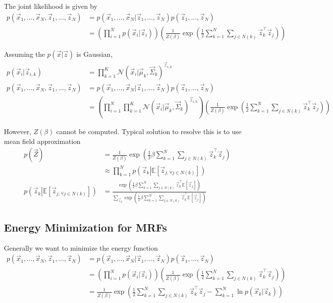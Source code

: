 \documentclass[12pt,twoside]{article}
\begin{document}
The joint likelihood is given by
\begin{align*}
	p(\vec{x}_1, \ldots, \vec{x}_N,\vec{z}_1, \ldots, \vec{z}_N) 
	& = p(\vec{x}_1, \ldots, \vec{x}_N \vert \vec{z}_1, \ldots, \vec{z}_N) p(\vec{z}_1, \ldots, \vec{z}_N)\\
	& = \left(\prod_{i=1}^N p(\vec{x}_i \vert \vec{z}_i)\right)\left(\frac{1}{Z(\beta)} \exp\left(\frac{1}{2} \sum_{k=1}^N \sum_{j\in N(k)} \vec{z}_k^\top\vec{z}_j\right)\right)	
\end{align*}

Assuming the $p(\vec{x}\vert \vec{z})$ is Gaussian,
\begin{align*}
	p(\vec{x}_i\vert \vec{z}_{i,k}) 
	&= \prod_{k=1}^K \mathcal{N}(\vec{x}_i \vert \vec{\mu}_k, \vec{\Sigma}_k)^{\vec{z}_{i,k}}\\
	p(\vec{x}_1, \ldots, \vec{x}_N,\vec{z}_1, \ldots, \vec{z}_N) 
	& = p(\vec{x}_1, \ldots, \vec{x}_N \vert \vec{z}_1, \ldots, \vec{z}_N) p(\vec{z}_1, \ldots, \vec{z}_N)\\
	& = \left(\prod_{i=1}^N \prod_{k=1}^K \mathcal{N} (\vec{x}_i \vert \vec{\mu}_k, \vec{\Sigma}_k)^{\vec{z}_{i,k}}\right) \left(\frac{1}{Z(\beta)} \exp\left(\frac{1}{2} \sum_{k=1}^N \sum_{j\in N(k)} \vec{z}_k^\top\vec{z}_j\right)\right)	
\end{align*}

However, $Z(\beta)$ cannot be computed. Typical solution to resolve this is to use mean field approximation
\begin{align*}
	p(\vec{Z}) &= \frac{1}{Z(\beta)} \exp\left(\frac{1}{2} \beta \sum_{k=1}^N \sum_{j\in N(k)}\vec{z}_k^\top \vec{z}_j\right)\\
					& \approx \prod_{k=1}^N p\left(\vec{z}_k \left\vert \mathbb{E} [\vec{z}_{j, \forall j\in N(k)}]\right.\right)\\
	p\left(\vec{z}_k \left\vert \mathbb{E} [\vec{z}_{j, \forall j\in N(k)}]\right.\right)
					& = \frac{\exp\left(\frac{1}{2}\beta \sum_{k=1}^N \sum_{j\in N(k)} \vec{z}_k^\top \mathbb{E}[\vec{z}_j]\right)}{\sum_{\vec{z}_k}\exp\left(\frac{1}{2}\beta \sum_{k=1}^N \sum_{j\in N(k)} \vec{z}_k^\top \mathbb{E}[\vec{z}_j]\right)}
\end{align*}

\subsection{Energy Minimization for MRFs}
Generally we want to minimize the energy function
\begin{align*}
	p(\vec{x}_1,\ldots, \vec{x}_N, \vec{z}_1, \ldots, \vec{z}_N)
	& = p(\vec{x}_1, \ldots, \vec{x}_N \vert \vec{z}_1, \ldots, \vec{z}_N) p(\vec{z}_1, \ldots, \vec{z}_N)\\
	& = \left(\prod_{i=1}^N p(\vec{x}_i \vert \vec{z}_i)\right)\left(\frac{1}{Z(\beta)} \exp\left(\frac{1}{2} \sum_{k=1}^N \sum_{j\in N(k)} \vec{z}_k^\top\vec{z}_j\right)\right)	\\
	& = \frac{1}{Z(\beta)} \exp\left(\frac{1}{2} \sum_{k=1}^N \sum_{j\in N(k)} \vec{z}_k^\top\vec{z}_j - \sum_{k=1}^N \ln p(\vec{x}_k \vert \vec{z}_k)\right)
\end{align*}
\end{document}
